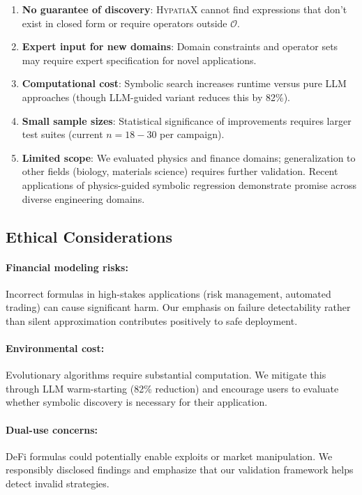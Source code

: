 \documentclass[twoside,11pt]{article}
\begin{document}
\begin{enumerate}
\item \textbf{No guarantee of discovery}: \textsc{HypatiaX} cannot find expressions that don't exist in closed form or require operators outside $\mathcal{O}$.

\item \textbf{Expert input for new domains}: Domain constraints and operator sets may require expert specification for novel applications.

\item \textbf{Computational cost}: Symbolic search increases runtime versus pure LLM approaches (though LLM-guided variant reduces this by 82\%).

\item \textbf{Small sample sizes}: Statistical significance of improvements requires larger test suites (current $n = 18-30$ per campaign).

\item \textbf{Limited scope}: We evaluated physics and finance domains; generalization to other fields (biology, materials science) requires further validation. Recent applications of physics-guided symbolic regression \citep{zhang2026formula,senetakis2026symbolic,li2026physics} demonstrate promise across diverse engineering domains.
\end{enumerate}

\subsection{Ethical Considerations}

\paragraph{Financial modeling risks:} Incorrect formulas in high-stakes applications (risk management, automated trading) can cause significant harm. Our emphasis on failure detectability rather than silent approximation contributes positively to safe deployment.

\paragraph{Environmental cost:} Evolutionary algorithms require substantial computation. We mitigate this through LLM warm-starting (82\% reduction) and encourage users to evaluate whether symbolic discovery is necessary for their application.

\paragraph{Dual-use concerns:} DeFi formulas could potentially enable exploits or market manipulation. We responsibly disclosed findings and emphasize that our validation framework helps detect invalid strategies.
\end{document}
